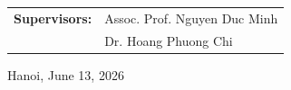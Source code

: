 \begin{titlepage}
\begin{center}
    \vspace{1.2cm}
    \begin{tabular}{rl}
        \textbf{Supervisors:} & Assoc. Prof. Nguyen Duc Minh \\
                              & Dr. Hoang Phuong Chi
    \end{tabular}

    \vfill
    {\fontsize{13pt}{16pt}\selectfont Hanoi, June 13, 2026}
\end{center}

\end{titlepage}